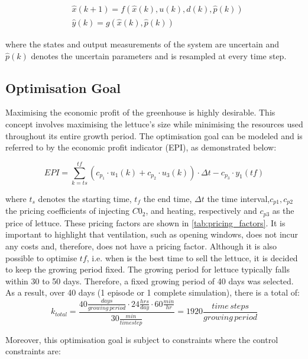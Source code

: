 \begin{equation}\label{eq:greenhouse_model_discrete_uncertain}
	\begin{aligned}
		& \hat x(k+1) = f(\hat x(k),u(k),d(k),\hat p(k)) \\
		& \hat y(k) = g(\hat x(k),\hat p(k))
	\end{aligned}
\end{equation}

where the states and output measurements of the system are uncertain and $\hat{p}(k)$ denotes the uncertain parameters and is resampled at every time step.



\subsection{Optimisation Goal}
\label{ssection:optimization-goal}
Maximising the economic profit of the greenhouse is highly desirable. This concept involves maximising the lettuce's size while minimising the resources used throughout its entire growth period. The optimisation goal can be modeled and is referred to by the economic profit indicator (EPI), as demonstrated below:

\begin{equation}\label{eq:epi}
	EPI = \sum_{k = ts}^{tf} (c_{p_1} \cdot u_1(k) + c_{p_2} \cdot u_3(k))\cdot \Delta t - c_{p_3} \cdot y_1(tf)
\end{equation}

where $t_s$ denotes the starting time, $t_f$ the end time, $\Delta t$ the time interval,$c_{p1},c_{p2}$ the pricing coefficients of injecting $C0_2$, and heating, respectively and $c_{p3}$ as the price of lettuce. These pricing factors are shown in \autoref{tab:pricing_factors}. It is important to highlight that ventilation, such as opening windows, does not incur any costs and, therefore, does not have a pricing factor. Although it is also possible to optimise $tf$, i.e. when is the best time to sell the lettuce, it is decided to keep the growing period fixed. The growing period for lettuce typically falls within 30 to 50 days. Therefore, a fixed growing period of 40 days was selected. As a result, over 40 days (1 episode or 1 complete simulation), there is a total of:
$$
k_{total} = \frac{40 \frac{days}{growing \, period} \cdot 24 \frac{hrs}{day} \cdot 60 \frac{min}{hr}}{30 \frac{min}{timestep}} = 1920 \frac{time \, steps}{growing \, period}
$$

Moreover, this optimisation goal is subject to constraints where the control constraints are:

